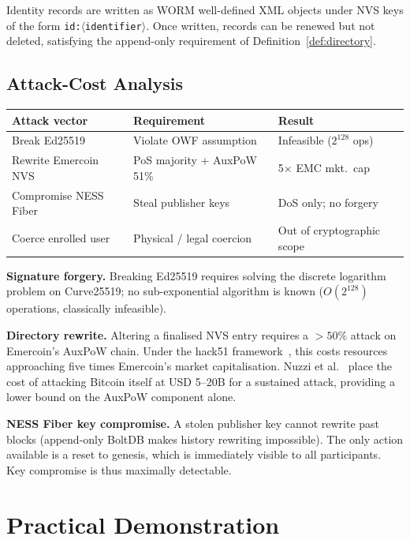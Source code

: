 \documentclass[11pt,a4paper]{article}
\begin{document}
Identity records are written as WORM well-defined XML objects under NVS keys of the form
\texttt{id:$\langle$identifier$\rangle$}.  Once written, records can be
renewed but not deleted, satisfying the append-only requirement of
Definition~\ref{def:directory}.

\subsection{Attack-Cost Analysis}

\begin{center}
\begin{tabular}{lll}
  \toprule
  \textbf{Attack vector} & \textbf{Requirement} & \textbf{Result} \\
  \midrule
  Break Ed25519    & Violate OWF assumption   & Infeasible ($2^{128}$ ops) \\
  Rewrite Emercoin NVS & PoS majority + AuxPoW 51\% & 5$\times$ EMC mkt.\ cap~\cite{hack51} \\
  Compromise NESS Fiber & Steal publisher keys & DoS only; no forgery \\
  Coerce enrolled user  & Physical / legal coercion & Out of cryptographic scope \\
  \bottomrule
\end{tabular}
\end{center}

\textbf{Signature forgery.}  Breaking Ed25519 requires solving the discrete
logarithm problem on Curve25519; no sub-exponential algorithm is known
($O(2^{128})$ operations, classically infeasible).

\textbf{Directory rewrite.}  Altering a finalised NVS entry requires a
$>50\%$ attack on Emercoin's AuxPoW chain.  Under the hack51
framework~\cite{hack51}, this costs resources approaching five times
Emercoin's market capitalisation.  Nuzzi et al.~\cite{nuzzi2024} place the
cost of attacking Bitcoin itself at USD 5--20B for a sustained attack,
providing a lower bound on the AuxPoW component alone.

\textbf{NESS Fiber key compromise.}  A stolen publisher key cannot rewrite
past blocks (append-only BoltDB makes history rewriting impossible).  The only
action available is a reset to genesis, which is immediately visible to all
participants.  Key compromise is thus maximally detectable.

\section{Practical Demonstration}
\label{sec:demo}
\end{document}

